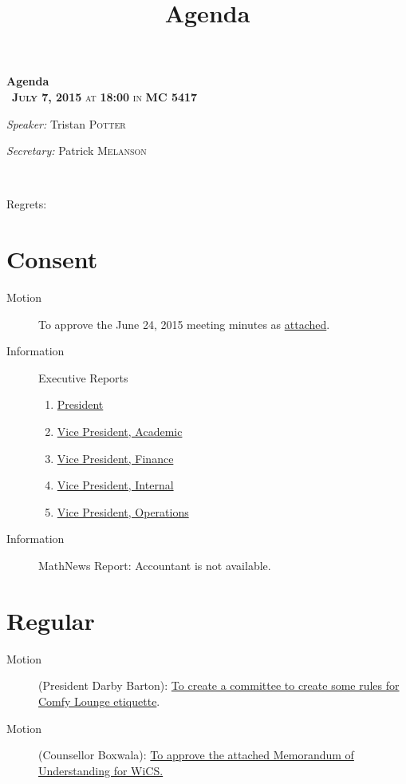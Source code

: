 \documentclass[12pt, letterpaper]{article}
\title{Agenda}
\newcommand{\meetingDate}{July 7, 2015}
\newcommand{\meetingTime}{18:00}
\newcommand{\meetingLocation}{MC 5417}
\begin{document}
\hypersetup{} %


\begin{center}
{ \huge \bfseries Agenda \\[0.4cm] }
{\textsc{~\textbf{\meetingDate} at \textbf{\meetingTime} in \textbf{\meetingLocation}}}
\\[0.2cm]

\begin{minipage}[t]{0.5\textwidth}
\begin{flushleft} \large
\emph{Speaker:}
Tristan \textsc{Potter}
\end{flushleft}
\end{minipage}%
\begin{minipage}[t]{0.5\textwidth}
\begin{flushright} \large
\emph{Secretary:} 
Patrick \textsc{Melanson}
\end{flushright}
\end{minipage}

\HRule \\[0.4cm]
\end{center}
Regrets:

\section*{Consent}
\begin{description}
	\item[Motion] To approve the June 24, 2015 meeting minutes as \hyperref[minutes]{attached}.
	\item[Information] Executive Reports
	\begin{enumerate}
		\item \hyperref[president]{President}
		\item \hyperref[vpacademic]{Vice President, Academic}
		\item \hyperref[vpfinance]{Vice President, Finance}
		\item \hyperref[vpinternal]{Vice President, Internal}
		\item \hyperref[vpoperations]{Vice President, Operations}
	\end{enumerate}
	\item[Information] MathNews Report: Accountant is not available.
\end{description}
\HRule

\section*{Regular}
\begin{description}
	\item[Motion] (President Darby Barton): \hyperref[comfy]{To create a committee to create some rules for Comfy Lounge etiquette}.
	\item[Motion] (Counsellor Boxwala): \hyperref[wics]{To approve the attached Memorandum of Understanding for WiCS.}
\end{description}
\HRule
\end{document}
